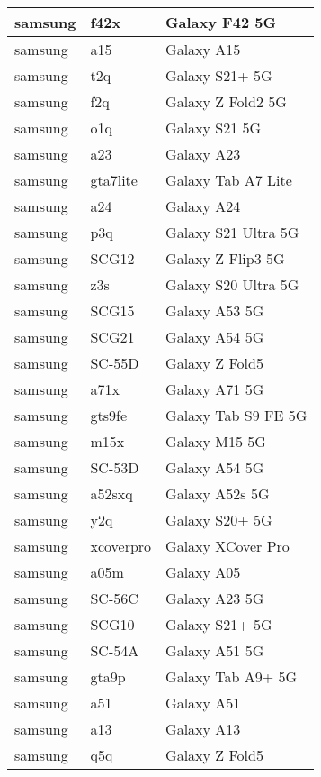 \begin{tabularx}{\linewidth}{|l|X|X|}
        samsung & f42x & Galaxy F42 5G \\ \hline
        samsung & a15 & Galaxy A15 \\ \hline
        samsung & t2q & Galaxy S21+ 5G \\ \hline
        samsung & f2q & Galaxy Z Fold2 5G \\ \hline
        samsung & o1q & Galaxy S21 5G \\ \hline
        samsung & a23 & Galaxy A23 \\ \hline
        samsung & gta7lite & Galaxy Tab A7 Lite \\ \hline
        samsung & a24 & Galaxy A24 \\ \hline
        samsung & p3q & Galaxy S21 Ultra 5G \\ \hline
        samsung & SCG12 & Galaxy Z Flip3 5G \\ \hline
        samsung & z3s & Galaxy S20 Ultra 5G \\ \hline
        samsung & SCG15 & Galaxy A53 5G \\ \hline
        samsung & SCG21 & Galaxy A54 5G \\ \hline
        samsung & SC-55D & Galaxy Z Fold5 \\ \hline
        samsung & a71x & Galaxy A71 5G \\ \hline
        samsung & gts9fe & Galaxy Tab S9 FE 5G \\ \hline
        samsung & m15x & Galaxy M15 5G \\ \hline
        samsung & SC-53D & Galaxy A54 5G \\ \hline
        samsung & a52sxq & Galaxy A52s 5G \\ \hline
        samsung & y2q & Galaxy S20+ 5G \\ \hline
        samsung & xcoverpro & Galaxy XCover Pro \\ \hline
        samsung & a05m & Galaxy A05 \\ \hline
        samsung & SC-56C & Galaxy A23 5G \\ \hline
        samsung & SCG10 & Galaxy S21+ 5G \\ \hline
        samsung & SC-54A & Galaxy A51 5G \\ \hline
        samsung & gta9p & Galaxy Tab A9+ 5G \\ \hline
        samsung & a51 & Galaxy A51 \\ \hline
        samsung & a13 & Galaxy A13 \\ \hline
        samsung & q5q & Galaxy Z Fold5 \\ \hline

\end{tabularx}
